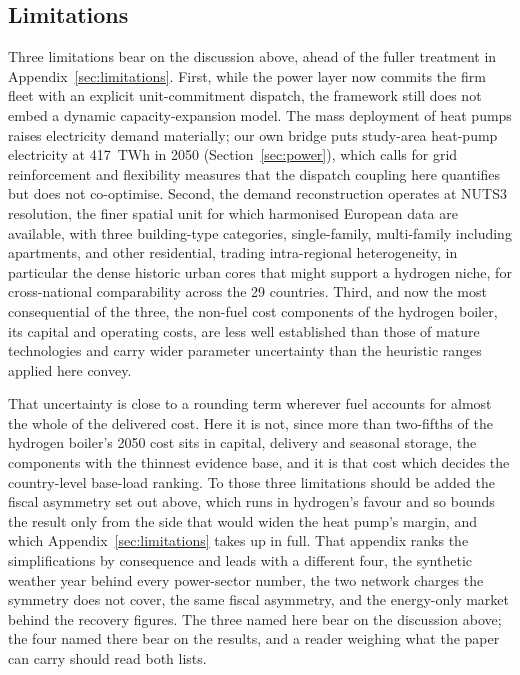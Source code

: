 \subsection{Limitations}

Three limitations bear on the discussion above, ahead of the fuller treatment in
Appendix~\ref{sec:limitations}. First, while the power layer now commits the firm fleet
with an explicit unit-commitment dispatch, the framework still does not embed a dynamic
capacity-expansion model. The mass deployment of heat pumps raises electricity demand materially; our own bridge puts study-area heat-pump electricity at 417~TWh in 2050 (Section~\ref{sec:power}), which calls for grid reinforcement and flexibility measures that the dispatch coupling here
quantifies but does not co-optimise. Second, the demand reconstruction operates at NUTS3
resolution, the finer spatial unit for which harmonised European data are available, with
three building-type categories, single-family, multi-family including apartments, and
other residential, trading intra-regional heterogeneity, in particular the dense
historic urban cores that might support a hydrogen niche, for cross-national
comparability across the 29 countries. Third, and now the most consequential of the
three, the non-fuel cost components of the hydrogen boiler, its capital and operating
costs, are less well established than those of mature technologies and carry wider
parameter uncertainty than the heuristic ranges applied here convey.

That uncertainty is close to a rounding term wherever fuel accounts for almost the whole
of the delivered cost. Here it is not, since more than two-fifths of the hydrogen
boiler's 2050 cost sits in capital, delivery and seasonal storage, the components
with the thinnest evidence base, and it is that cost which decides the country-level
base-load ranking. To those three limitations should be added the fiscal asymmetry set
out above, which runs in hydrogen's favour and so bounds the result only from the side
that would widen the heat pump's margin, and which Appendix~\ref{sec:limitations} takes
up in full. That appendix ranks the simplifications by consequence and leads with a
different four, the synthetic weather year behind every power-sector number, the two
network charges the symmetry does not cover, the same fiscal asymmetry, and the
energy-only market behind the recovery figures. The three named here bear on the
discussion above; the four named there bear on the results, and a reader weighing what
the paper can carry should read both lists.
